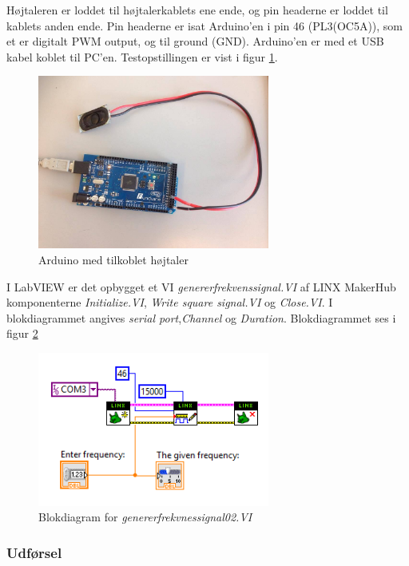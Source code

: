 		Højtaleren er loddet til højtalerkablets ene ende, og pin headerne er loddet til kablets anden ende. 
		Pin headerne er isat Arduino'en i pin 46 (PL3(OC5A)), som et er digitalt PWM output, og til ground (GND). 
		Arduino'en er med et USB kabel koblet til PC'en. Testopstillingen er vist i figur \ref{fig:etha1}.\\ 
	  
			\begin{figure}[htb]
			\centering
				\includegraphics[width=3in]{haArduino}
				\caption{Arduino med tilkoblet højtaler}	
				\label{fig:etha1}
			\end{figure}

I LabVIEW er det opbygget et VI \textit{genererfrekvenssignal.VI} af LINX MakerHub komponenterne \textit{Initialize.VI}, \textit{Write square signal.VI} og \textit{Close.VI}. I blokdiagrammet angives \textit{serial port},\textit{Channel} og \textit{Duration}.  	Blokdiagrammet ses i figur \ref{fig:gf02} 

\begin{figure}[htb]
			\centering
				\includegraphics[width=3in]{gf02}
				\caption{Blokdiagram for \textit{genererfrekvnessignal02.VI}}	
				\label{fig:gf02}
			\end{figure}
				
\subsubsection{Udførsel}

